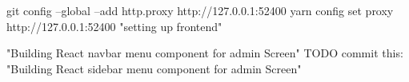 git config --global --add http.proxy http://127.0.0.1:52400
yarn config set proxy http://127.0.0.1:52400
"setting up frontend"

"Building React navbar menu component for admin Screen"
TODO commit this:
"Building React sidebar menu component for admin Screen"
